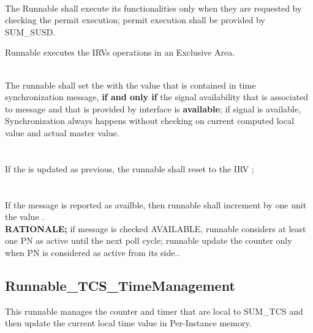 \\
The Runnable shall execute its functionalities only when they are requested by checking the permit execution; permit execution shall be provided by SUM\_SUSD.
\\
{}



Runnable executes the IRVs operations in an Exclusive Area.

\\
The runnable shall set the  with the value that is contained in time synchronization message, \textbf{if and only if} the signal availability
that is associated to message and that is provided by interface  is \textbf{available}; if signal is available, Synchronization always happens without checking
on current computed local value and actual master value.
\\
{   }
\\
\\
If the  is updated as previous, the runnable shall reset to  the IRV ;
\\
\\
\\
If the message is reported as availble, then runnable shall increment by one unit the value .
\\
{\textbf{RATIONALE;} if message is checked AVAILABLE, runnable considers at least one PN as active until the next poll cycle; runnable update the counter only when PN is considered as active from its side.}.
\\
{     }

\subsection{Runnable_TCS_TimeManagement}
\label{subsec:Runnable_TCS_TimeManagement}

This runnable manages the counter and timer that are local to SUM\_TCS and then update the current local time value in Per-Instance memory.

